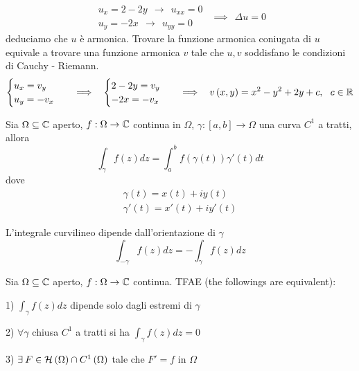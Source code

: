 \begin{equation*}
\begin{array}{ r }
u_{x} = 2 - 2y\ \ \rightarrow \ \ u_{xx} = 0\\
u_{y} = - 2x\ \ \rightarrow \ \ u_{yy} = 0
\end{array} \ \ \implies \ \ \Delta u = 0
\end{equation*}
deduciamo che $u$ è armonica. Trovare la funzione armonica coniugata di $u$ equivale a trovare una funzione armonica $v$ tale che $u,v$ soddisfano le condizioni di Cauchy - Riemann.
\begin{equation*}
\begin{cases}
u_{x} = v_{y}\\
u_{y} = - v_{x}
\end{cases} \ \ \implies \ \ \begin{cases}
2 - 2y = v_{y}\\
- 2x = -v_{x}
\end{cases} \ \ \implies \ \ v\left(x,y\right) = x^{2} - y^{2} + 2y + c,\ \ c\in \mathbb{R} 
\end{equation*}
\Soluzione
\begin{defn}
Sia $\Omega \subseteq \mathbb{C} $ aperto, $f:\Omega \rightarrow \mathbb{C} $ continua in $\Omega $, $\gamma :\left[ a,b\right]\rightarrow \Omega $ una curva $C^{1}$ a tratti, allora
\begin{equation*}
\int\nolimits _{\gamma } f\left(z\right) dz = \int\nolimits ^{b}_{a} f\left(\gamma \left(t\right)\right) \gamma '\left(t\right) dt
\end{equation*}
dove
\begin{gather*}
\gamma \left(t\right) = x\left(t\right) + iy\left(t\right)\\
\gamma '\left(t\right) = x'\left(t\right) + iy'\left(t\right)
\end{gather*}
\end{defn}
\begin{rem}
L'integrale curvilineo dipende dall'orientazione di $\gamma $
\begin{equation*}
\int\nolimits _{ - \gamma } f\left(z\right) dz = -\int\nolimits _{\gamma } f\left(z\right) dz
\end{equation*}
\end{rem}
\begin{thm}
Sia $\Omega \subseteq \mathbb{C} $ aperto, $f:\Omega \rightarrow \mathbb{C} $ continua. TFAE (the followings are equivalent):

1) $\int _{\gamma } f\left(z\right) dz$ dipende solo dagli estremi di $\gamma $

2) $\forall \gamma $ chiusa $C^{1}$ a tratti si ha $\int _{\gamma } f\left(z\right) dz = 0$

3) $\exists F\in \Hc \left(\Omega \right) \cap C^{1}\left(\Omega \right)$ tale che $F' = f$ in $\Omega $
\end{thm}
